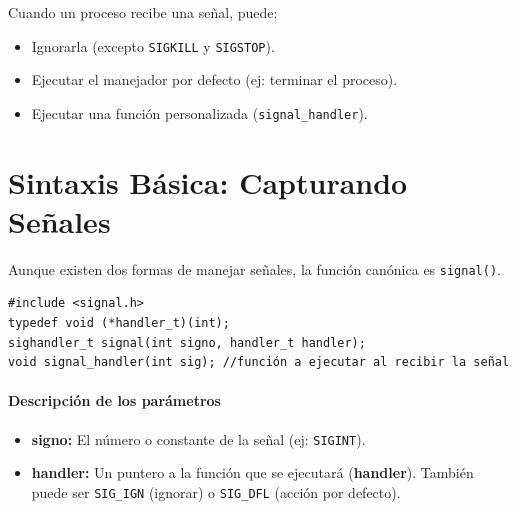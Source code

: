 \documentclass[12pt,a4paper]{article}
\begin{document}
Cuando un proceso recibe una señal, puede:
\begin{itemize}
    \item Ignorarla (excepto \texttt{SIGKILL} y \texttt{SIGSTOP}).
    \item Ejecutar el manejador por defecto (ej: terminar el proceso).
    \item Ejecutar una función personalizada (\texttt{signal\_handler}).
\end{itemize}

\newpage

\section{Sintaxis Básica: Capturando Señales}
Aunque existen dos formas de manejar señales, la función canónica es \texttt{signal()}.

\begin{lstlisting}[numbers=none]
#include <signal.h>
typedef void (*handler_t)(int);
sighandler_t signal(int signo, handler_t handler);
void signal_handler(int sig); //función a ejecutar al recibir la señal
\end{lstlisting}

\paragraph{Descripción de los parámetros}
\begin{itemize}
    \item \textbf{signo:} El número o constante de la señal (ej: \texttt{SIGINT}).
    \item \textbf{handler:} Un puntero a la función que se ejecutará (\textbf{handler}). También puede ser \texttt{SIG\_IGN} (ignorar) o \texttt{SIG\_DFL} (acción por defecto).
\end{itemize}
\end{document}
